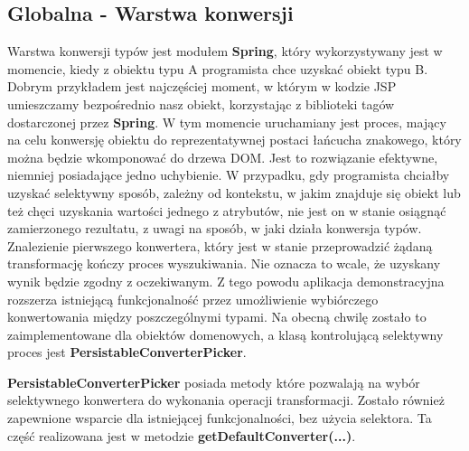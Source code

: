 \subsection{Globalna - Warstwa konwersji}
	Warstwa konwersji typów jest modułem \textbf{Spring}, który wykorzystywany jest w momencie, kiedy z obiektu typu A programista chce uzyskać obiekt typu B. Dobrym przykładem jest najczęściej moment, w którym w kodzie JSP umieszczamy bezpośrednio nasz obiekt, korzystając z biblioteki tagów dostarczonej przez \textbf{Spring}. W tym momencie uruchamiany jest proces, mający na celu konwersję obiektu do reprezentatywnej postaci łańcucha znakowego, który można będzie wkomponować do drzewa DOM. Jest to rozwiązanie efektywne, niemniej posiadające jedno uchybienie. W przypadku, gdy programista chciałby uzyskać selektywny sposób, zależny od kontekstu, w jakim znajduje się obiekt lub też chęci uzyskania wartości jednego z atrybutów, nie jest on w stanie osiągnąć zamierzonego rezultatu, z uwagi na sposób, w jaki działa konwersja typów. Znalezienie pierwszego konwertera, który jest w stanie przeprowadzić żądaną transformację kończy proces wyszukiwania. Nie oznacza to wcale, że uzyskany wynik będzie zgodny z oczekiwanym. Z tego powodu aplikacja demonstracyjna rozszerza istniejącą funkcjonalność przez umożliwienie wybiórczego konwertowania między poszczególnymi typami. Na obecną chwilę zostało to zaimplementowane dla obiektów domenowych, a klasą kontrolującą selektywny proces jest \textbf{PersistableConverterPicker}.
	\textbf{PersistableConverterPicker} posiada metody które pozwalają na wybór selektywnego konwertera do wykonania operacji
	transformacji. Zostało również zapewnione wsparcie dla istniejącej funkcjonalności, bez użycia selektora. Ta część realizowana jest w 
	metodzie \textbf{getDefaultConverter(...)}.
	
